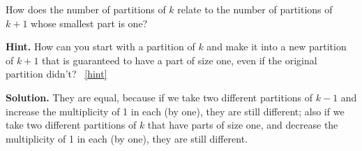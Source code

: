 \documentclass{book}
\begin{document}
\setcounter{project}{213}
\addtocounter{project}{-1}
\begin{activity}[]\label{activity-206}
\hypertarget{p-1176}{}%
How does the number of partitions of \(k\) relate to the number of partitions of \(k+1\) whose smallest part is one?%
\par\smallskip%
\noindent\textbf{Hint.}\hypertarget{hint-133}{}\quad%
\hypertarget{p-1177}{}%
How can you start with a partition of \(k\) and make it into a new partition of \(k+1\) that is guaranteed to have a part of size one, even if the original partition didn't?%
~\hfill{\tiny\hyperlink{a-213}{[hint]}\hypertarget{q-213}{}}\par\smallskip%
\noindent\textbf{Solution.}\hypertarget{solution-124}{}\quad%
\hypertarget{p-1178}{}%
They are equal, because if we take two different partitions of \(k-1\) and increase the multiplicity of 1 in each (by one), they are still different; also if we take two different partitions of \(k\) that have parts of size one, and decrease the multiplicity of 1 in each (by one), they are still different.%
\end{activity}
\end{document}

